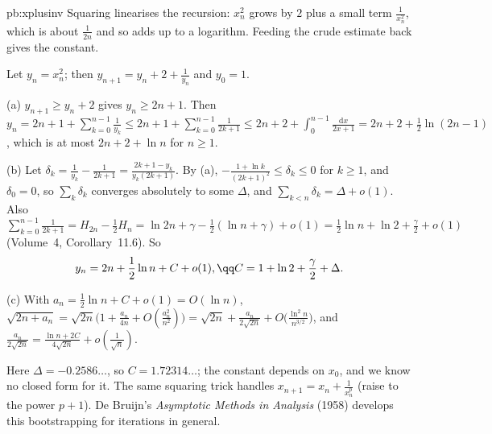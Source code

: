 \begin{solution}{pb:xplusinv}
\idea Squaring linearises the recursion: $x_n^2$ grows by $2$ plus a small term $\frac1{x_n^2}$, which is about $\frac1{2n}$ and so adds up to a logarithm. Feeding the crude estimate back
gives the constant.

\writeup Let $y_n=x_n^2$; then $y_{n+1}=y_n+2+\frac1{y_n}$ and $y_0=1$.

(a) $y_{n+1}\ge y_n+2$ gives $y_n\ge2n+1$. Then $y_n=2n+1+\sum_{k=0}^{n-1}\frac1{y_k}\le2n+1+\sum_{k=0}^{n-1}\frac1{2k+1}\le2n+2+\int_0^{n-1}\frac{\mathrm dx}{2x+1}=2n+2+\frac12\ln(2n-1)$, which is at most
$2n+2+\ln n$ for $n\ge1$.

(b) Let $\delta_k=\frac1{y_k}-\frac1{2k+1}=\frac{2k+1-y_k}{y_k(2k+1)}$. By (a), $-\frac{1+\ln k}{(2k+1)^2}\le\delta_k\le0$ for $k\ge1$, and $\delta_0=0$, so $\sum_k\delta_k$ converges absolutely to some $\Delta$, and
$\sum_{k<n}\delta_k=\Delta+o(1)$. Also $\sum_{k=0}^{n-1}\frac1{2k+1}=H_{2n}-\frac12H_n=\ln2n+\gamma-\frac12(\ln n+\gamma)+o(1)=\frac12\ln n+\ln2+\frac\gamma2+o(1)$ (Volume~4, Corollary~11.6). So
\[
y_n=2n+\frac12\ln n+C+o(1),\qq C=1+\ln2+\frac\gamma2+\Delta.
\]

(c) With $a_n=\frac12\ln n+C+o(1)=O(\ln n)$, $\sqrt{2n+a_n}=\sqrt{2n}\bigl(1+\frac{a_n}{4n}+O(\frac{a_n^2}{n^2})\bigr)=\sqrt{2n}+\frac{a_n}{2\sqrt{2n}}+O\bigl(\frac{\ln^2n}{n^{3/2}}\bigr)$, and $\frac{a_n}{2\sqrt{2n}}=\frac{\ln n+2C}{4\sqrt{2n}}+o(\frac1{\sqrt n})$.

\leads Here $\Delta=-0.2586\ldots$, so $C=1.72314\ldots$; the constant depends on $x_0$, and we know no closed form for it. The same squaring trick handles $x_{n+1}=x_n+\frac1{x_n^p}$ (raise to the
power $p+1$). De Bruijn's \emph{Asymptotic Methods in Analysis} (1958) develops this bootstrapping for iterations in general.
\end{solution}

